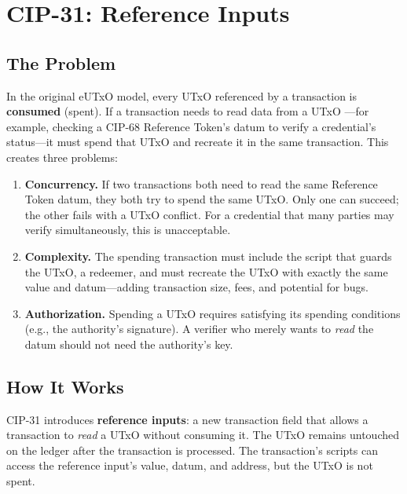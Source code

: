 \section{CIP-31: Reference Inputs}
\label{sec:cip31}

\subsection{The Problem}

In the original eUTxO model, every UTxO referenced by a transaction is
\textbf{consumed} (spent).  If a transaction needs to read data from a UTxO
---for example, checking a CIP-68 Reference Token's datum to verify a
credential's status---it must spend that UTxO and recreate it in the same
transaction.  This creates three problems:

\begin{enumerate}[nosep]
  \item \textbf{Concurrency.}  If two transactions both need to read the
    same Reference Token datum, they both try to spend the same UTxO.  Only
    one can succeed; the other fails with a UTxO conflict.  For a credential
    that many parties may verify simultaneously, this is unacceptable.
  \item \textbf{Complexity.}  The spending transaction must include the
    script that guards the UTxO, a redeemer, and must recreate the UTxO with
    exactly the same value and datum---adding transaction size, fees, and
    potential for bugs.
  \item \textbf{Authorization.}  Spending a UTxO requires satisfying its
    spending conditions (e.g., the authority's signature).  A verifier who
    merely wants to \emph{read} the datum should not need the authority's
    key.
\end{enumerate}

\subsection{How It Works}

CIP-31 introduces \textbf{reference inputs}: a new transaction field that
allows a transaction to \emph{read} a UTxO without consuming it.  The UTxO
remains untouched on the ledger after the transaction is processed.  The
transaction's scripts can access the reference input's value, datum, and
address, but the UTxO is not spent.

